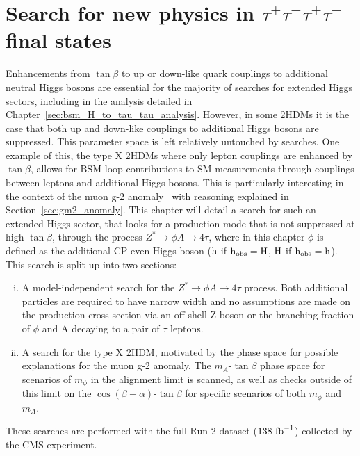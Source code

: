 \chapter{\texorpdfstring{Search for new physics in $\tau^+\tau^-\tau^+\tau^-$ final states}{Search for new physics in tautautautau final states}}
\label{sec:H_A_to_4_tau_analysis}

Enhancements from $\tan\beta$ to up or down-like quark couplings to additional neutral Higgs bosons are essential for the majority of searches for extended Higgs sectors, including in the analysis detailed in Chapter~\ref{sec:bsm_H_to_tau_tau_analysis}.
However, in some \ac{2HDM}s it is the case that both up and down-like couplings to additional Higgs bosons are suppressed.
This parameter space is left relatively untouched by  searches.
One example of this, the type X \ac{2HDM}s where only lepton couplings are enhanced by $\tan\beta$, allows for \ac{BSM} loop contributions to \ac{SM} measurements through couplings between leptons and additional Higgs bosons.
This is particularly interesting in the context of the muon g-2 anomaly~\cite{Muong-2:2006rrc,Muong-2:2021ojo} with reasoning explained in Section~\ref{sec:gm2_anomaly}.
This chapter will detail a search for such an extended Higgs sector, that looks for a production mode that is not suppressed at high $\tan\beta$, through the process $Z^{*}\rightarrow \phi A \rightarrow 4\tau$, where in this chapter $\phi$ is defined as the additional \ac{CP}-even Higgs boson (${\text{h}}$ if ${\text{h}}_{\text{obs}}={\text{H}}$, ${\text{H}}$ if ${\text{h}}_{\text{obs}}={\text{h}}$).
This search is split up into two sections:

\begin{enumerate}[i)]
  \item A model-independent search for the $Z^{*}\rightarrow \phi A \rightarrow 4\tau$ process. Both additional particles are required to have narrow width and no assumptions are made on the production cross section via an off-shell Z boson or the branching fraction of $\phi$ and A decaying to a pair of $\tau$ leptons.
   \item A search for the type X \ac{2HDM}, motivated by the phase space for possible explanations for the muon g-2 anomaly. The $m_{A}$-$\tan\beta$ phase space for scenarios of $m_\phi$ in the alignment limit is scanned, as well as checks outside of this limit on the $\cos(\beta-\alpha)$-$\tan\beta$ for specific scenarios of both $m_\phi$ and $m_A$.
\end{enumerate}

These searches are performed with the full Run 2 dataset ($138 \text{ fb}^{-1}$) collected by the \ac{CMS} experiment. 

